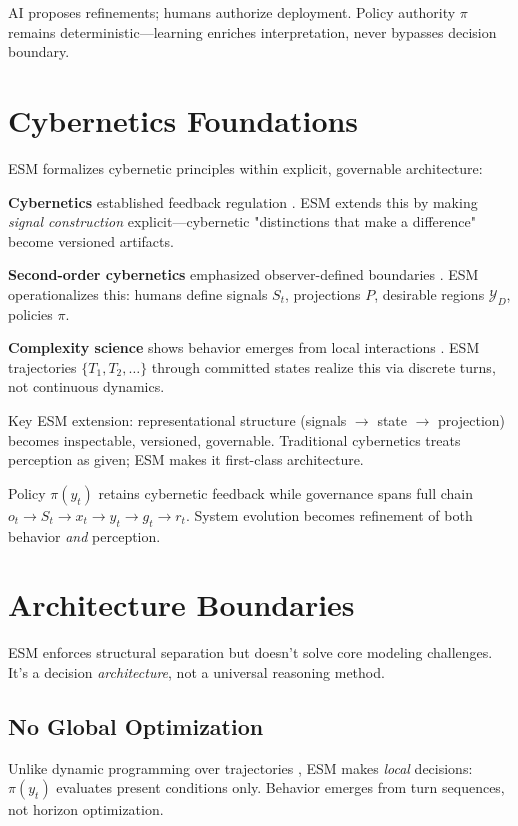 \documentclass[11pt]{article}
\begin{document}
AI proposes refinements; humans authorize deployment. Policy authority $\pi$ remains deterministic---learning enriches interpretation, never bypasses decision boundary.

\section{Cybernetics Foundations}

ESM formalizes cybernetic principles within explicit, governable architecture:

\textbf{Cybernetics} established feedback regulation \cite{wiener1948, ashby1956}. ESM extends this by making \emph{signal construction} explicit---cybernetic "distinctions that make a difference" become versioned artifacts.

\textbf{Second-order cybernetics} emphasized observer-defined boundaries \cite{vonfoerster1974}. ESM operationalizes this: humans define signals $S_t$, projections $P$, desirable regions $\mathcal{Y}_D$, policies $\pi$.

\textbf{Complexity science} shows behavior emerges from local interactions \cite{wolfram2002}. ESM trajectories $\{T_1, T_2, \dots\}$ through committed states realize this via discrete turns, not continuous dynamics.

Key ESM extension: representational structure (signals $\to$ state $\to$ projection) becomes inspectable, versioned, governable. Traditional cybernetics treats perception as given; ESM makes it first-class architecture.

Policy $\pi(y_t)$ retains cybernetic feedback while governance spans full chain $o_t \to S_t \to x_t \to y_t \to g_t \to r_t$. System evolution becomes refinement of both behavior \emph{and} perception.


\section{Architecture Boundaries}

ESM enforces structural separation but doesn't solve core modeling challenges. It's a decision \emph{architecture}, not a universal reasoning method.

\subsection{No Global Optimization}
Unlike dynamic programming over trajectories \cite{bellman1957}, ESM makes \emph{local} decisions: $\pi(y_t)$ evaluates present conditions only. Behavior emerges from turn sequences, not horizon optimization.
\end{document}
